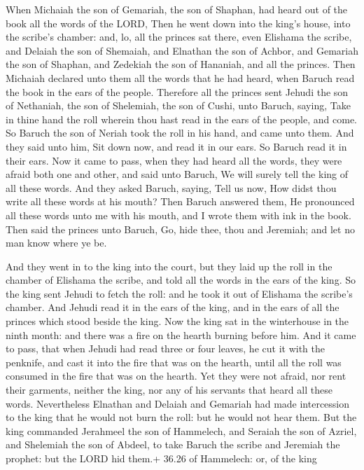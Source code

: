  When Michaiah the son of Gemariah, the son of Shaphan,
had heard out of the book all the words of the LORD,  Then
he went down into the king's house, into the scribe's chamber: and, lo,
all the princes sat there, even Elishama the scribe, and Delaiah the son
of Shemaiah, and Elnathan the son of Achbor, and Gemariah the son of
Shaphan, and Zedekiah the son of Hananiah, and all the princes.
 Then Michaiah declared unto them all the words that he had
heard, when Baruch read the book in the ears of the people.
 Therefore all the princes sent Jehudi the son of
Nethaniah, the son of Shelemiah, the son of Cushi, unto Baruch, saying,
Take in thine hand the roll wherein thou hast read in the ears of the
people, and come. So Baruch the son of Neriah took the roll in his hand,
and came unto them.  And they said unto him, Sit down now,
and read it in our ears. So Baruch read it in their ears. 
Now it came to pass, when they had heard all the words, they were afraid
both one and other, and said unto Baruch, We will surely tell the king
of all these words.  And they asked Baruch, saying, Tell us
now, How didst thou write all these words at his mouth? 
Then Baruch answered them, He pronounced all these words unto me with
his mouth, and I wrote them with ink in the book.  Then
said the princes unto Baruch, Go, hide thee, thou and Jeremiah; and let
no man know where ye be.

 And they went in to the king into the court, but they
laid up the roll in the chamber of Elishama the scribe, and told all the
words in the ears of the king.  So the king sent Jehudi to
fetch the roll: and he took it out of Elishama the scribe's chamber. And
Jehudi read it in the ears of the king, and in the ears of all the
princes which stood beside the king.  Now the king sat in
the winterhouse in the ninth month: and there was a fire on the hearth
burning before him.  And it came to pass, that when Jehudi
had read three or four leaves, he cut it with the penknife, and cast it
into the fire that was on the hearth, until all the roll was consumed in
the fire that was on the hearth.  Yet they were not afraid,
nor rent their garments, neither the king, nor any of his servants that
heard all these words.  Nevertheless Elnathan and Delaiah
and Gemariah had made intercession to the king that he would not burn
the roll: but he would not hear them.  But the king
commanded Jerahmeel the son of Hammelech, and Seraiah the son of Azriel,
and Shelemiah the son of Abdeel, to take Baruch the scribe and Jeremiah
the prophet: but the LORD hid them.+ 36.26 of Hammelech: or, of the king

